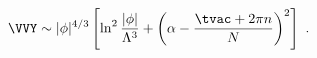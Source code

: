 \begin{equation}
\label{V_VY}
  \VVY \sim |\phi|^{4/3} \left[ \ln^2 \frac{|\phi|}{\Lambda^3} 
  + \left( \alpha -\frac{\tvac+2\pi n}{N} \right)^2 \right]~.
\end{equation}

